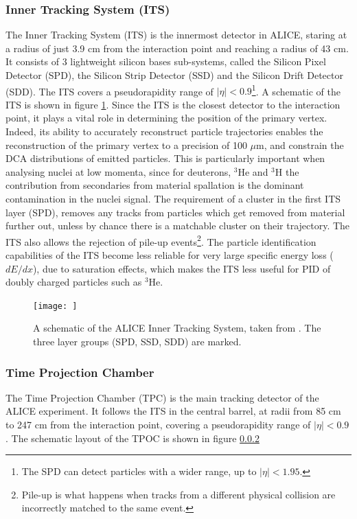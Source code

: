 \subsubsection{Inner Tracking System (ITS)}
The Inner Tracking System (ITS) is the innermost detector in ALICE, staring at a radius of just 3.9 cm from the interaction point and reaching a radius of 43 cm. It consists of 3 lightweight silicon bases sub-systems, called the Silicon Pixel Detector (SPD), the Silicon Strip Detector (SSD) and the Silicon Drift Detector (SDD). The ITS covers a pseudorapidity range of $|\eta|<0.9$\footnote{The SPD can detect particles with a wider range, up to $|\eta|<1.95$.}. A schematic of the ITS is shown in figure \ref{fig:ITS_schematic}. Since the ITS is the closest detector to the interaction point, it plays a vital role in determining the position of the primary vertex. Indeed, its ability to accurately reconstruct particle trajectories enables the reconstruction of the primary vertex to a precision of 100 $\mu$m, and constrain the DCA distributions of emitted particles. This is particularly important when analysing nuclei at low momenta, since for deuterons, $^3\mathrm{He}$ and $^3\mathrm{H}$ the contribution from secondaries from material spallation is the dominant contamination in the nuclei signal. The requirement of a cluster in the first ITS layer (SPD), removes any tracks from particles which get removed from material further out, unless by chance there is a matchable cluster on their trajectory.  The ITS also allows the rejection of pile-up events\footnote{Pile-up is what happens when tracks from a different physical collision are incorrectly matched to the same event.}. The particle identification capabilities of the ITS become less reliable for very large specific energy loss ($dE/dx$), due to saturation effects, which makes the ITS less useful for PID of doubly charged particles such as $^3\mathrm{He}$.

\begin{figure}[hbtp]
    \centering
    \texttt{[image: ]}
    \caption{A schematic of the ALICE Inner Tracking System, taken from \cite{}. The three layer groups (SPD, SSD, SDD) are marked. }
    \label{fig:ITS_schematic}
\end{figure}

\subsubsection{Time Projection Chamber}
The Time Projection Chamber (TPC) is the main tracking detector of the ALICE experiment. It follows the ITS in the central barrel, at radii from 85 cm to 247 cm from the interaction point, covering a pseudorapidity range of $|\eta|<0.9$. The schematic layout of the TPOC is shown in figure \ref{} 

